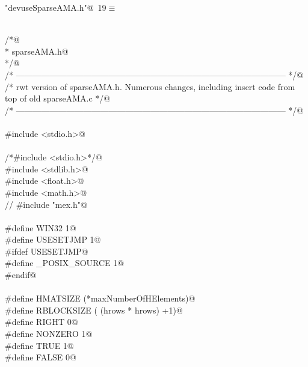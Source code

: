 \documentclass[12pt]{article}
\begin{document}
\begin{flushleft} \small
\begin{minipage}{\linewidth}\label{scrap6}\raggedright\small
{} \verb@"devuseSparseAMA.h"@\nobreak\ {\footnotesize {19}}$\equiv$
\vspace{-1ex}
\begin{list}{}{} \item
\mbox{}\verb@@\\
\mbox{}\verb@/*@\\
\mbox{}\verb@ * sparseAMA.h@\\
\mbox{}\verb@ */@\\
\mbox{}\verb@/* ------------------------------------------------------------------------------------------------ */@\\
\mbox{}\verb@/* rwt version of sparseAMA.h.  Numerous changes, including insert code from top of old sparseAMA.c */@\\
\mbox{}\verb@/* ------------------------------------------------------------------------------------------------ */@\\
\mbox{}\verb@@\\
\mbox{}\verb@#include <stdio.h>@\\
\mbox{}\verb@@\\
\mbox{}\verb@/*#include <stdio.h>*/@\\
\mbox{}\verb@#include <stdlib.h>@\\
\mbox{}\verb@#include <float.h>@\\
\mbox{}\verb@#include <math.h>@\\
\mbox{}\verb@// #include "mex.h"@\\
\mbox{}\verb@@\\
\mbox{}\verb@#define WIN32 1@\\
\mbox{}\verb@#define USESETJMP 1@\\
\mbox{}\verb@#ifdef USESETJMP@\\
\mbox{}\verb@#define _POSIX_SOURCE 1@\\
\mbox{}\verb@#endif@\\
\mbox{}\verb@@\\
\mbox{}\verb@#define HMATSIZE (*maxNumberOfHElements)@\\
\mbox{}\verb@#define RBLOCKSIZE ( (hrows * hrows) +1)@\\
\mbox{}\verb@#define RIGHT 0@\\
\mbox{}\verb@#define NONZERO 1@\\
\mbox{}\verb@#define TRUE 1@\\
\mbox{}\verb@#define FALSE 0@\\

\end{list}
\end{minipage}
\end{flushleft}
\end{document}
